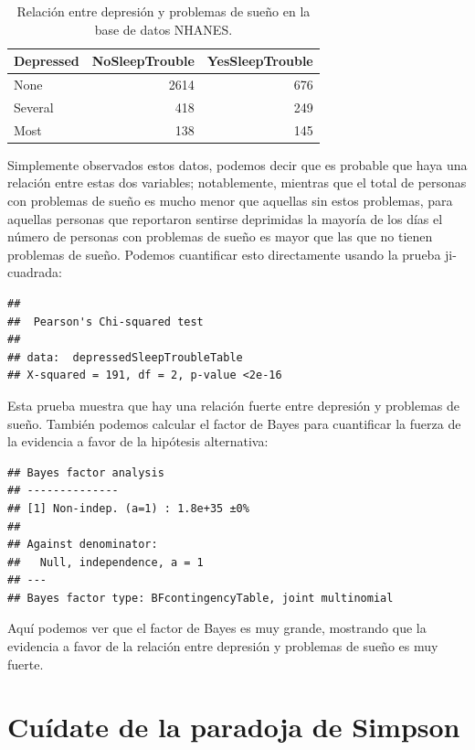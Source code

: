 \documentclass[
  12pt,
]{book}
\theoremstyle{definition}
\theoremstyle{definition}
\theoremstyle{definition}
\theoremstyle{remark}
\begin{document}
\begin{table}

\caption{\label{tab:unnamed-chunk-84}Relación entre depresión y problemas de sueño en la base de datos NHANES.}
\centering
\begin{tabular}[t]{l|r|r}
\hline
Depressed & NoSleepTrouble & YesSleepTrouble\\
\hline
None & 2614 & 676\\
\hline
Several & 418 & 249\\
\hline
Most & 138 & 145\\
\hline
\end{tabular}
\end{table}

Simplemente observados estos datos, podemos decir que es probable que haya una relación entre estas dos variables; notablemente, mientras que el total de personas con problemas de sueño es mucho menor que aquellas sin estos problemas, para aquellas personas que reportaron sentirse deprimidas la mayoría de los días el número de personas con problemas de sueño es mayor que las que no tienen problemas de sueño. Podemos cuantificar esto directamente usando la prueba ji-cuadrada:

\begin{verbatim}
## 
## 	Pearson's Chi-squared test
## 
## data:  depressedSleepTroubleTable
## X-squared = 191, df = 2, p-value <2e-16
\end{verbatim}

Esta prueba muestra que hay una relación fuerte entre depresión y problemas de sueño. También podemos calcular el factor de Bayes para cuantificar la fuerza de la evidencia a favor de la hipótesis alternativa:

\begin{verbatim}
## Bayes factor analysis
## --------------
## [1] Non-indep. (a=1) : 1.8e+35 ±0%
## 
## Against denominator:
##   Null, independence, a = 1 
## ---
## Bayes factor type: BFcontingencyTable, joint multinomial
\end{verbatim}

Aquí podemos ver que el factor de Bayes es muy grande, mostrando que la evidencia a favor de la relación entre depresión y problemas de sueño es muy fuerte.

\hypertarget{cuuxeddate-de-la-paradoja-de-simpson}{%
\section{Cuídate de la paradoja de Simpson}\label{cuuxeddate-de-la-paradoja-de-simpson}}
\end{document}
